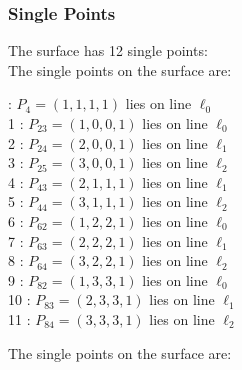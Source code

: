 \documentclass{article}
\begin{document}
{\subsubsection*{Single Points}
The surface has 12 single points:\\
The single points on the surface are:\\
\begin{multicols}{2}
 : $P_{4}=( 1, 1, 1, 1 )$ lies on line $\ell_{0}$\\
1 : $P_{23}=( 1, 0, 0, 1 )$ lies on line $\ell_{0}$\\
2 : $P_{24}=( 2, 0, 0, 1 )$ lies on line $\ell_{1}$\\
3 : $P_{25}=( 3, 0, 0, 1 )$ lies on line $\ell_{2}$\\
4 : $P_{43}=( 2, 1, 1, 1 )$ lies on line $\ell_{1}$\\
5 : $P_{44}=( 3, 1, 1, 1 )$ lies on line $\ell_{2}$\\
6 : $P_{62}=( 1, 2, 2, 1 )$ lies on line $\ell_{0}$\\
7 : $P_{63}=( 2, 2, 2, 1 )$ lies on line $\ell_{1}$\\
8 : $P_{64}=( 3, 2, 2, 1 )$ lies on line $\ell_{2}$\\
9 : $P_{82}=( 1, 3, 3, 1 )$ lies on line $\ell_{0}$\\
10 : $P_{83}=( 2, 3, 3, 1 )$ lies on line $\ell_{1}$\\
11 : $P_{84}=( 3, 3, 3, 1 )$ lies on line $\ell_{2}$\\
\end{multicols}
The single points on the surface are:\\
}
\end{document}
